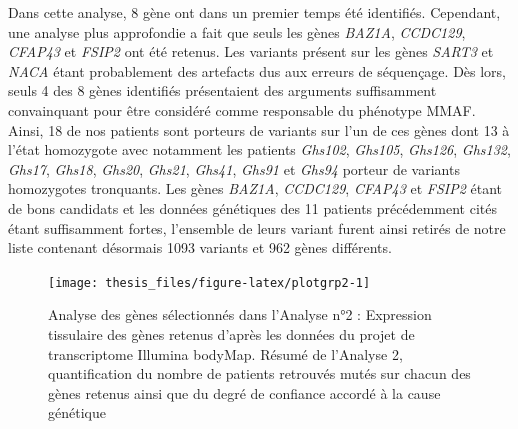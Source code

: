 \documentclass[12pt,twoside]{reedthesis}
\theoremstyle{definition}
\theoremstyle{definition}
\theoremstyle{remark}
\begin{document}
  Dans cette analyse, 8 gène ont dans un premier temps été identifiés.
  Cependant, une analyse plus approfondie a fait que seuls les gènes
  \emph{BAZ1A}, \emph{CCDC129}, \emph{CFAP43} et \emph{FSIP2} ont été
  retenus. Les variants présent sur les gènes \emph{SART3} et \emph{NACA}
  étant probablement des artefacts dus aux erreurs de séquençage. Dès
  lors, seuls 4 des 8 gènes identifiés présentaient des arguments
  suffisamment convainquant pour être considéré comme responsable du
  phénotype MMAF. Ainsi, 18 de nos patients sont porteurs de variants sur
  l'un de ces gènes dont 13 à l'état homozygote avec notamment les
  patients \emph{Ghs102}, \emph{Ghs105}, \emph{Ghs126}, \emph{Ghs132},
  \emph{Ghs17}, \emph{Ghs18}, \emph{Ghs20}, \emph{Ghs21}, \emph{Ghs41},
  \emph{Ghs91} et \emph{Ghs94} porteur de variants homozygotes tronquants.
  Les gènes \emph{BAZ1A}, \emph{CCDC129}, \emph{CFAP43} et \emph{FSIP2}
  étant de bons candidats et les données génétiques des 11 patients
  précédemment cités étant suffisamment fortes, l'ensemble de leurs
  variant furent ainsi retirés de notre liste contenant désormais 1093
  variants et 962 gènes différents.
  
  \newpage  
  
  \begin{figure}
  
  {\centering \texttt{[image: thesis\_files/figure-latex/plotgrp2-1]} 
  
  }
  
  \caption[Analyse des gènes sélectionnés dans l'Analyse n°2]{Analyse des gènes sélectionnés dans l'Analyse n°2 : Expression tissulaire des gènes retenus d'après les données du projet de transcriptome Illumina bodyMap. Résumé de l'Analyse 2, quantification du nombre de patients retrouvés mutés sur chacun des gènes retenus ainsi que du degré de confiance accordé à la cause génétique}\label{fig:plotgrp2}
  \end{figure}
  
  \newpage  
  
\end{document}
